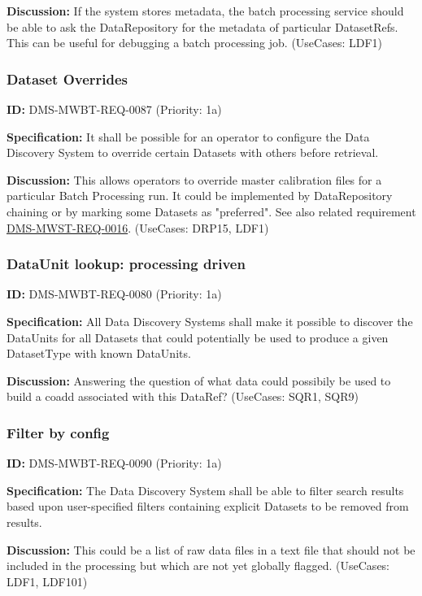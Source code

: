 \documentclass[SE,toc,lsstdraft]{lsstdoc}
\begin{document}
\textbf{Discussion:}
If the system stores metadata, the batch processing service should be able to ask the DataRepository for the metadata of particular DatasetRefs. This can be useful for debugging a batch processing job. (UseCases: LDF1)

\subsubsection{Dataset Overrides}

\label{DMS-MWBT-REQ-0087}
\textbf{ID:} DMS-MWBT-REQ-0087 (Priority: 1a)

\textbf{Specification:}
It shall be possible for an operator to configure the Data Discovery System to override certain Datasets with others before retrieval.

\textbf{Discussion:}
This allows operators to override master calibration files for a particular Batch Processing run. It could be implemented by DataRepository chaining or by marking some Datasets as "preferred". See also related requirement \hyperref[DMS-MWST-REQ-0016]{DMS-MWST-REQ-0016}. (UseCases: DRP15, LDF1)

\subsubsection{DataUnit lookup: processing driven}

\label{DMS-MWBT-REQ-0080}
\textbf{ID:} DMS-MWBT-REQ-0080 (Priority: 1a)

\textbf{Specification:}
All Data Discovery Systems shall make it possible to discover the DataUnits for all Datasets that could potentially be used to produce a given DatasetType with known DataUnits.

\textbf{Discussion:}
Answering the question of what data could possibily be used to build a coadd associated with this DataRef? (UseCases: SQR1, SQR9)

\subsubsection{Filter by config}

\label{DMS-MWBT-REQ-0090}
\textbf{ID:} DMS-MWBT-REQ-0090 (Priority: 1a)

\textbf{Specification:}
The Data Discovery System shall be able to filter search results based upon user-specified filters containing explicit Datasets to be removed from results.

\textbf{Discussion:}
This could be a list of raw data files in a text file that should not be included in the processing but which are not yet globally flagged. (UseCases: LDF1, LDF101)
\end{document}
